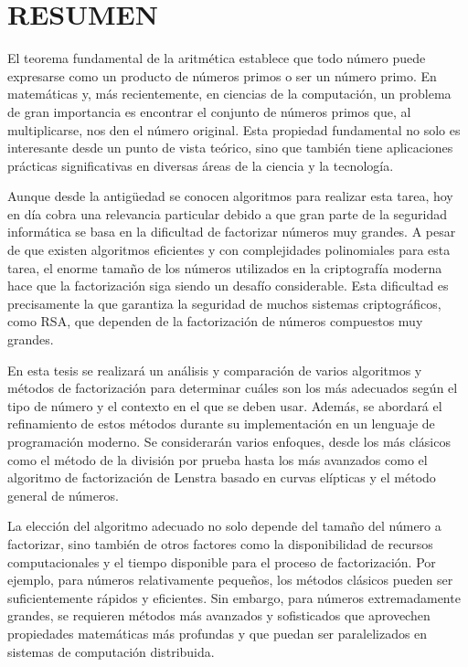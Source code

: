 \clearpage
\chapter*{\centering \normalsize RESUMEN}
El teorema fundamental de la aritmética establece que todo número puede expresarse como un producto de números primos o ser un número primo. En matemáticas y, más recientemente, en ciencias de la computación, un problema de gran importancia es encontrar el conjunto de números primos que, al multiplicarse, nos den el número original. Esta propiedad fundamental no solo es interesante desde un punto de vista teórico, sino que también tiene aplicaciones prácticas significativas en diversas áreas de la ciencia y la tecnología.

Aunque desde la antigüedad se conocen algoritmos para realizar esta tarea, hoy en día cobra una relevancia particular debido a que gran parte de la seguridad informática se basa en la dificultad de factorizar números muy grandes. A pesar de que existen algoritmos eficientes y con complejidades polinomiales para esta tarea, el enorme tamaño de los números utilizados en la criptografía moderna hace que la factorización siga siendo un desafío considerable. Esta dificultad es precisamente la que garantiza la seguridad de muchos sistemas criptográficos, como RSA, que dependen de la factorización de números compuestos muy grandes.

En esta tesis se realizará un análisis y comparación de varios algoritmos y métodos de factorización para determinar cuáles son los más adecuados según el tipo de número y el contexto en el que se deben usar. Además, se abordará el refinamiento de estos métodos durante su implementación en un lenguaje de programación moderno. Se considerarán varios enfoques, desde los más clásicos como el método de la división por prueba hasta los más avanzados como el algoritmo de factorización de Lenstra basado en curvas elípticas y el método general de números.

La elección del algoritmo adecuado no solo depende del tamaño del número a factorizar, sino también de otros factores como la disponibilidad de recursos computacionales y el tiempo disponible para el proceso de factorización. Por ejemplo, para números relativamente pequeños, los métodos clásicos pueden ser suficientemente rápidos y eficientes. Sin embargo, para números extremadamente grandes, se requieren métodos más avanzados y sofisticados que aprovechen propiedades matemáticas más profundas y que puedan ser paralelizados en sistemas de computación distribuida.


